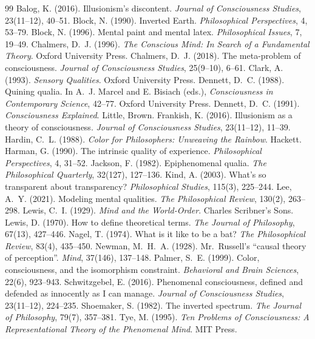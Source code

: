 \documentclass{situationist-preprint}
\begin{document}
\begin{thebibliography}{99}\small
{} Balog, K. (2016). Illusionism's discontent. \emph{Journal of Consciousness Studies}, 23(11--12), 40--51.
 Block, N. (1990). Inverted Earth. \emph{Philosophical Perspectives}, 4, 53--79.
 Block, N. (1996). Mental paint and mental latex. \emph{Philosophical Issues}, 7, 19--49.
 Chalmers, D.~J. (1996). \emph{The Conscious Mind: In Search of a Fundamental Theory}. Oxford University Press.
 Chalmers, D.~J. (2018). The meta-problem of consciousness. \emph{Journal of Consciousness Studies}, 25(9--10), 6--61.
 Clark, A. (1993). \emph{Sensory Qualities}. Oxford University Press.
 Dennett, D.~C. (1988). Quining qualia. In A.~J. Marcel and E. Bisiach (eds.), \emph{Consciousness in Contemporary Science}, 42--77. Oxford University Press.
 Dennett, D.~C. (1991). \emph{Consciousness Explained}. Little, Brown.
 Frankish, K. (2016). Illusionism as a theory of consciousness. \emph{Journal of Consciousness Studies}, 23(11--12), 11--39.
 Hardin, C.~L. (1988). \emph{Color for Philosophers: Unweaving the Rainbow}. Hackett.
 Harman, G. (1990). The intrinsic quality of experience. \emph{Philosophical Perspectives}, 4, 31--52.
 Jackson, F. (1982). Epiphenomenal qualia. \emph{The Philosophical Quarterly}, 32(127), 127--136.
 Kind, A. (2003). What's so transparent about transparency? \emph{Philosophical Studies}, 115(3), 225--244.
 Lee, A.~Y. (2021). Modeling mental qualities. \emph{The Philosophical Review}, 130(2), 263--298.
 Lewis, C.~I. (1929). \emph{Mind and the World-Order}. Charles Scribner's Sons.
 Lewis, D. (1970). How to define theoretical terms. \emph{The Journal of Philosophy}, 67(13), 427--446.
 Nagel, T. (1974). What is it like to be a bat? \emph{The Philosophical Review}, 83(4), 435--450.
 Newman, M.~H.~A. (1928). Mr.\ Russell's \enquote{causal theory of perception}. \emph{Mind}, 37(146), 137--148.
 Palmer, S.~E. (1999). Color, consciousness, and the isomorphism constraint. \emph{Behavioral and Brain Sciences}, 22(6), 923--943.
 Schwitzgebel, E. (2016). Phenomenal consciousness, defined and defended as innocently as I can manage. \emph{Journal of Consciousness Studies}, 23(11--12), 224--235.
 Shoemaker, S. (1982). The inverted spectrum. \emph{The Journal of Philosophy}, 79(7), 357--381.
 Tye, M. (1995). \emph{Ten Problems of Consciousness: A Representational Theory of the Phenomenal Mind}. MIT Press.
\end{thebibliography}
\end{document}
